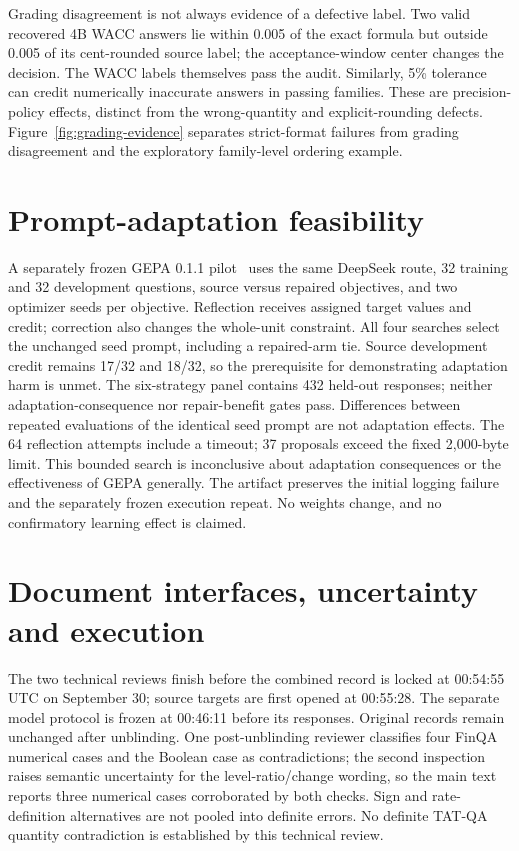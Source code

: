Grading disagreement is not always evidence of a defective label. Two valid recovered 4B WACC answers lie within 0.005 of the exact formula but outside 0.005 of its cent-rounded source label; the acceptance-window center changes the decision. The WACC labels themselves pass the audit. Similarly, 5\% tolerance can credit numerically inaccurate answers in passing families. These are precision-policy effects, distinct from the wrong-quantity and explicit-rounding defects. Figure~\ref{fig:grading-evidence} separates strict-format failures from grading disagreement and the exploratory family-level ordering example.

\section{Prompt-adaptation feasibility}\label{app:adaptation}
A separately frozen GEPA 0.1.1 pilot~\cite{gepa} uses the same DeepSeek route, 32 training and 32 development questions, source versus repaired objectives, and two optimizer seeds per objective. Reflection receives assigned target values and credit; correction also changes the whole-unit constraint. All four searches select the unchanged seed prompt, including a repaired-arm tie. Source development credit remains 17/32 and 18/32, so the prerequisite for demonstrating adaptation harm is unmet. The six-strategy panel contains 432 held-out responses; neither adaptation-consequence nor repair-benefit gates pass. Differences between repeated evaluations of the identical seed prompt are not adaptation effects. The 64 reflection attempts include a timeout; 37 proposals exceed the fixed 2,000-byte limit. This bounded search is inconclusive about adaptation consequences or the effectiveness of GEPA generally. The artifact preserves the initial logging failure and the separately frozen execution repeat. No weights change, and no confirmatory learning effect is claimed.

\section{Document interfaces, uncertainty and execution}\label{app:document-details}
The two technical reviews finish before the combined record is locked at 00:54:55 UTC on September 30; source targets are first opened at 00:55:28. The separate model protocol is frozen at 00:46:11 before its responses. Original records remain unchanged after unblinding. One post-unblinding reviewer classifies four FinQA numerical cases and the Boolean case as contradictions; the second inspection raises semantic uncertainty for the level-ratio/change wording, so the main text reports three numerical cases corroborated by both checks. Sign and rate-definition alternatives are not pooled into definite errors. No definite TAT-QA quantity contradiction is established by this technical review.

